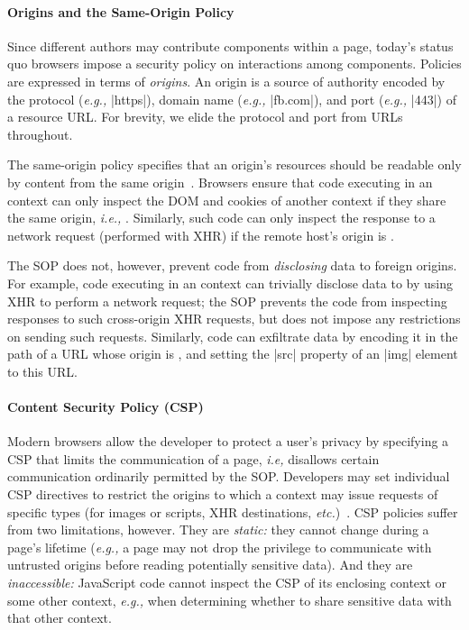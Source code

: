 \paragraph{Origins and the Same-Origin Policy}
Since different authors may contribute components within a page,
today's status quo browsers impose a security policy on interactions
among components. Policies are expressed in terms of \emph{origins}.
An origin is a source of authority encoded by the protocol (\emph{e.g.,}
\js|https|), domain name (\emph{e.g.,} \js|fb.com|), and port (\emph{e.g.,} \js|443|)
of a resource URL. For brevity, we elide the protocol and
port from URLs throughout.

The same-origin policy specifies that an origin's
resources should be readable only by content from the same
origin~\cite{rfc6454, googlehandbook, VanKesteren2012}.  Browsers
ensure that code executing in an  context can only
inspect the DOM and cookies of another context if they share the same
origin, \emph{i.e.,} . Similarly, such code can only
inspect the response to a network request (performed with XHR) if the
remote host's origin is .
%
 
The SOP does not, however, prevent code from \emph{disclosing} data to
foreign origins. For example, code executing in an 
context can trivially disclose data to  by using XHR to
perform a network request; the SOP prevents the code from
inspecting responses to such cross-origin XHR requests, but does not
impose any restrictions on sending such requests.
Similarly, code can exfiltrate data by encoding it in the path of a
URL whose origin is , and setting the \js|src| property
of an \js|img| element to this URL.

\paragraph{Content Security Policy (CSP)}

Modern browsers allow the developer to protect a user's privacy by
specifying a CSP that limits the communication of a page, \emph{i.e,}
disallows certain communication ordinarily permitted by the SOP\@.
Developers may set individual CSP directives to restrict the origins
to which a context may issue requests of specific types (for images or
scripts, XHR destinations, \emph{etc.})~\cite{csp}. CSP policies
suffer from two limitations, however. They are {\em static:} they
cannot change during a page's lifetime (\emph{e.g.,} a page may not
drop the privilege to communicate with untrusted origins before
reading potentially sensitive data). And they are {\em inaccessible:}
JavaScript code cannot inspect the CSP of its enclosing context or
some other context, \emph{e.g.,} when determining whether to share
sensitive data with that other context.

